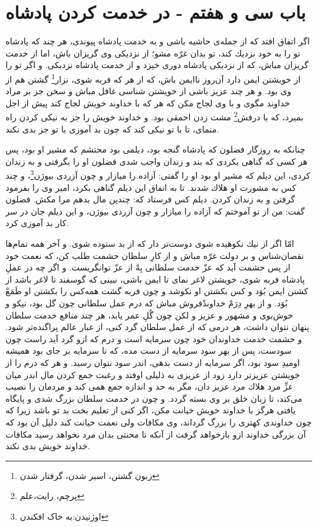 \section*{باب سى و هفتم - 
در خدمت كردن پادشاه}

اگر اتفاق افتد كه از جمله‌ی حاشيه باشى و به خدمت پادشاه پيوندى،  هر چند كه پادشاه تو را به خود نزديك كند، تو بدان غرّه مشو؛ از نزديكى وى گريزان باش، اما از خدمت گريزان مباش، كه از نزديكى پادشاه دورى خيزد و از خدمت پادشاه نزديكى. و اگر تو را از خويشتن ايمن دارد آن‌روز ناايمن باش، كه از هر كه فربه شوى، نزار\footnote{زبون گشتن، اسیر شدن، گرفتار شدن} گشتن هم از وى بود. و هر چند عزيز باشى از خويشتن شناسى غافل مباش و سخن جز بر مراد خداوند مگوى و با وى لجاج مكن كه هر كه با خداوند خويش لجاج كند پيش از اجل بميرد، كه با درفش\footnote{پرچم، رایت،‌علم} مشت زدن احمقى بود. و خداوند خويش را جز به نيكى كردن راه منماى، تا با تو نيكى كند كه چون بد آموزى با تو جز بدى نكند.

چنانكه به روزگار فضلون كه پادشاه گنجه بود، ديلمى بود محتشم كه مشير او بود، پس هر كسى كه گناهى بكردى كه بند و زندان واجب شدى فضلون او را بگرفتى و به زندان كردى، اين ديلم كه مشير او بود او را گفتى: آزاده را ميازار و چون آزردى بيوژن\footnote{اوژنیدن:به خاک افکندن}، و چند كس به مشورت او هلاك شدند. تا به اتفاق اين ديلم گناهى بكرد، امير وى را بفرمود گرفتن و به زندان كردن. ديلم كس فرستاد كه: چندين مال بدهم مرا مكش. فضلون گفت: من از تو آموختم كه آزاده را ميازار و چون آزردى بيوژن، و اين ديلم جان در سر كار بد آموزى كرد.

امّا اگر از نيك نكوهيده شوى دوست‌تر دار كه از بد ستوده شوى. و آخر همه تمام‌ها نقصان‌شناس و بر دولت غرّه مباش و از كارِ سلطان حشمت طلب كن، كه نعمت خود از پس حشمت آيد كه عزّ خدمت سلطانى بِهْ از عزّ توانگريست. و اگر چه در عملِ پادشاه فربه شوى، خويشتن لاغر نماى تا ايمن باشى، نبينى كه گوسفند تا لاغر باشد از كشتن ايمن بُوَد و كس بكشتن او نكوشد و چون فربه گشت همه‌كس را بكشتن او طَمَعْ بُوَد. و از بهرِ دِرَمْ خداوندْ‌فروش مباش كه درم عمل سلطانى چون گل بود، نيكو و خوش‌بوى و مشهور و عزيز و لكن چون گُلِ عمر يابد، هر چند منافع خدمت سلطان پنهان نتوان داشت، هر درمى كه از عمل سلطان گرد كنى، از غبار عالم پراگنده‌تر شود. و حشمت خدمت خداوندان خود چون سرمايه است و درم كه ازو گرد آيد راست چون سودست، پس از بهر سود سرمايه از دست مده، كه تا سرمايه بر جاى بود هميشه اوميدِ سود بود، اگر سرمايه از دست بدهى، اندر سود نتوان رسيد. و هر كه درم را از خويشتن عزيزتر دارد زود از عزيزى به ذليلى اوفتد و رغبت جمع كردن مال اندر ميان عزِّ مرد هلاك مرد عزيز دان، مگر به حد و اندازه جمع همى كند و مردمان را نصيب مى‌كند، تا زبان خلق بر وى بسته گردد. و چون در خدمت سلطان بزرگ شدى و پايگاه يافتى هرگز با خداوند خويش خيانت مكن، اگر كنى از تعليم بخت بد تو باشد زيرا كه چون خداوندى كهترى را بزرگ گرداند، وى مكافات ولى نعمت خيانت كند دليل آن بود كه آن بزرگى خداوند ازو بازخواهد گرفت از آنكه تا محنتى بدان مرد نخواهد رسيد مكافات خداوند خويش بدى نكند.


